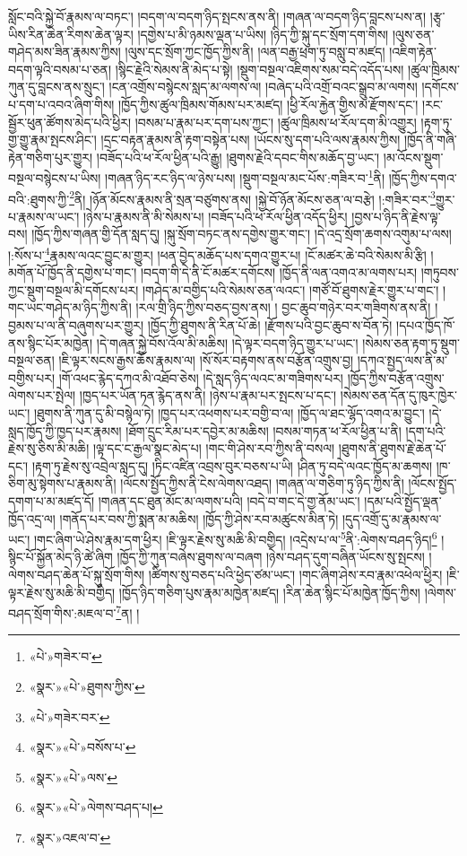 སློང་བའི་སྐྱེ་བོ་རྣམས་ལ་བཏང་། །བདག་ལ་བདག་ཉིད་སྤངས་ནས་ནི། །གཞན་ལ་བདག་ཉིད་བླངས་པས་ན། །རྩྭ་ཡིས་རིན་ཆེན་རིགས་ཆེན་ལྟར། །དགྱེས་པ་མི་ཉམས་ལྡན་པ་ཡིས། །ཉིད་ཀྱི་སྐུ་དང་སྲོག་དག་གིས། །ལུས་ཅན་གཤེད་མས་ཟིན་རྣམས་ཀྱིས། །ལུས་དང་སྲོག་ཀྱང་ཁྱོད་ཀྱིས་ནི། །ལན་བརྒྱ་ཕྲག་ཏུ་བསླུ་བ་མཛད། །འཇིག་རྟེན་བདག་ལྟའི་བསམ་པ་ཅན། །སྙིང་རྗེའི་སེམས་ནི་མེད་པ་སྟེ། །སྡུག་བསྔལ་འཇིགས་སམ་བདེ་འདོད་པས། །ཚུལ་ཁྲིམས་ཀུན་དུ་བླངས་ནས་སྲུང་། །ངན་འགྲོས་བསྙེངས་སླད་མ་ལགས་ལ། །བཞེད་པའི་འགྲོ་བའང་སྒྲུབ་མ་ལགས། །དགོངས་པ་དག་པ་འབའ་ཞིག་གིས། །ཁྱོད་ཀྱིས་ཚུལ་ཁྲིམས་གོམས་པར་མཛད། །ཕྱི་རོལ་རྐྱེན་གྱིས་མ་རྫོགས་དང་། །རང་སྦྱོར་ཕུན་ཚོགས་མེད་པའི་ཕྱིར། །བསམ་པ་རྣམ་པར་དག་པས་ཀྱང་། །ཚུལ་ཁྲིམས་ཕ་རོལ་དག་མི་འགྱུར། །རྟག་ཏུ་གྱ་གྱུ་རྣམ་སྤངས་ཤིང་། །དྲང་བརྟན་རྣམས་ནི་རྟག་བསྟེན་པས། །ཡོངས་སུ་དག་པའི་ལས་རྣམས་ཀྱིས། །ཁྱོད་ནི་གཞི་རྟེན་གཅིག་པུར་གྱུར། །བཟོད་པའི་ཕ་རོལ་ཕྱིན་པའི་རྒྱུ། །ཐུགས་རྗེའི་དབང་གིས་མཆོད་བྱ་ཡང་། །མ་འོངས་སྡུག་བསྔལ་བསྙེངས་པ་ཡིས། །གཞན་ཉིད་རང་ཉིད་ལ་ཉེས་པས། །སྡུག་བསྔལ་མང་པོས་:གཟིར་བ་\footnote{«པེ་»གཟེར་བ་}ནི། །ཁྱོད་ཀྱིས་དགའ་བའི་:ཐུགས་ཀྱི་\footnote{«སྣར་»«པེ་»ཐུགས་ཀྱིས་}ནི། །ཉོན་མོངས་རྣམས་ནི་སྲན་བཙུགས་ནས། །སྐྱེ་བོ་ཉོན་མོངས་ཅན་ལ་བརྩེ། །:གཟིར་བར་\footnote{«པེ་»གཟེར་བར་}གྱུར་པ་རྣམས་ལ་ཡང་། །ཉེས་པ་རྣམས་ནི་མི་སེམས་པ། །བཟོད་པའི་ཕ་རོལ་ཕྱིན་འདོད་ཕྱིར། །བྱས་པ་ཉིད་ནི་རྗེས་ལྟ་བས། །ཁྱོད་ཀྱིས་གཞན་གྱི་དོན་སླད་དུ། །སྐུ་སྲོག་བཏང་ནས་དགྱེས་གྱུར་གང་། །དེ་འདྲ་སྲོག་ཆགས་འགུམ་པ་ལས། །:སོས་པ་\footnote{«སྣར་»«པེ་»བསོས་པ་}རྣམས་ལའང་བྱུང་མ་གྱུར། །ཕན་བྱེད་མཆོད་པས་དགའ་གྱུར་པ། །ངོ་མཚར་ཆེ་བའི་སེམས་མི་རྩི། །མགོན་པོ་ཁྱོད་ནི་དགྱེས་པ་གང་། །བདག་གི་དེ་ནི་ངོ་མཚར་དགོངས། །ཁྱོད་ནི་ལན་འགའ་མ་ལགས་པར། །གཏུབས་ཀྱང་སྡུག་བསྔལ་མི་དགོངས་པར། །གཤེད་མ་བགྱིད་པའི་སེམས་ཅན་ལའང་། །གཙོ་བོ་ཐུགས་རྗེར་གྱུར་པ་གང་། །གང་ཡང་གཤེད་མ་ཉིད་ཀྱིས་ནི། །རལ་གྲི་ཉིད་ཀྱིས་བཅད་བྱས་ནས། །
བྱང་ཆུབ་གཉེར་བར་གཟིགས་ནས་ནི། །བྱམས་པ་ལ་ནི་བཞུགས་པར་གྱུར། །ཁྱོད་ཀྱི་ཐུགས་ནི་རིན་པོ་ཆེ། །རྫོགས་པའི་བྱང་ཆུབ་ས་བོན་ཏེ། །དཔའ་ཁྱོད་ཁོ་ནས་སྙིང་པོར་མཁྱེན། །དེ་གཞན་སྐྱེ་བོས་འོལ་མི་མཆིས། །དེ་ལྟར་བདག་ཉིད་གྱུར་པ་ཡང་། །སེམས་ཅན་རྟག་ཏུ་སྡུག་བསྔལ་ཅན། །ཇི་ལྟར་སངས་རྒྱས་ཆོས་རྣམས་ལ། །སོ་སོར་བརྟགས་ནས་བརྩོན་འགྲུས་བྱ། །དཀའ་སྤྱད་ལས་ནི་མ་བགྱིས་པར། །གོ་འཕང་རྙེད་དཀའ་མི་འཐོབ་ཅེས། །དེ་སླད་ཉིད་ལའང་མ་གཟིགས་པར། །ཁྱོད་ཀྱིས་བརྩོན་འགྲུས་ལེགས་པར་སྤེལ། །ཁྱད་པར་ཡོན་ཏན་རྙེད་ནས་ནི། །ཉེས་པ་རྣམ་པར་སྤངས་པ་དང་། །སེམས་ཅན་དོན་དུ་ཁུར་ཁྱེར་ཡང་། །ཐུགས་ནི་ཀུན་དུ་མི་བསྙེལ་ཏེ། །ཁྱད་པར་འཕགས་པར་བགྱི་བ་ལ། །ཁྱོད་ལ་ཐང་ལྷོད་འགའ་མ་བྱུང་། །དེ་སླད་ཁྱོད་ཀྱི་ཁྱད་པར་རྣམས། །ཐོག་དྲུང་རིམ་པར་དབྱེར་མ་མཆིས། །བསམ་གཏན་ཕ་རོལ་ཕྱིན་པ་ནི། །དག་པའི་རྗེས་སུ་ཅིས་མི་མཆི། །ལྟ་དང་ང་རྒྱལ་སྣང་མེད་པ། །གང་གི་ཤེས་རབ་ཀྱིས་ནི་བསལ། །ཐུགས་ནི་ཐུགས་རྗེ་ཆེན་པོ་དང་། །རྟག་ཏུ་རྗེས་སུ་འབྲེལ་སླད་དུ། །ཏིང་འཛིན་འབྲས་བུར་བཅས་པ་ཡི། །ཤིན་ཏུ་བདེ་ལའང་ཁྱོད་མ་ཆགས། །ཁ་ཅིག་མུ་སྟེགས་པ་རྣམས་ནི། །ལོངས་སྤྱོད་ཀྱིས་ནི་ངེས་ལེགས་འཐད། །གཞན་ལ་གཅིག་ཏུ་ཉིད་ཀྱིས་ནི། །ལོངས་སྤྱོད་དགག་པ་མ་མཛད་དོ། །གཞན་དང་ཐུན་མོང་མ་ལགས་པའི། །བདེ་བ་གང་དེ་གྱ་ནོམ་ཡང་། །དམ་པའི་སྤྱོད་ལྡན་ཁྱོད་འདྲ་ལ། །གནོད་པར་བས་ཀྱི་སྨན་མ་མཆིས། །ཁྱོད་ཀྱི་ཤེས་རབ་མཚུངས་མིན་ཏེ། །དུད་འགྲོ་དུ་མ་རྣམས་ལ་ཡང་། །གང་ཞིག་ཡེ་ཤེས་རྣམ་དག་ཕྱིར། །ཇི་ལྟར་རྗེས་སུ་མཆི་མི་བགྱིད། །འདྲེས་པ་ལ་\footnote{«སྣར་»«པེ་»ལས་}ནི་:ལེགས་བཤད་ཉིད།\footnote{«སྣར་»«པེ་»ལེགས་བཤད་པ།} །སྙིང་པོ་སྐྱོན་མེད་ཉི་ཚེ་ཞིག །ཁྱོད་ཀྱི་ཀུན་བཞེས་ཐུགས་ལ་བཞག །ཉེས་བཤད་དུག་བཞིན་ཡོངས་སུ་སྤངས། །ལེགས་བཤད་ཆེན་པོ་སྐུ་སྲོག་གིས། །ཚིགས་སུ་བཅད་པའི་ཕྱེད་ཙམ་ཡང་། །གང་ཞིག་ཤེས་རབ་རྣམ་འཕེལ་ཕྱིར། །ཇི་ལྟར་རྗེས་སུ་མཆི་མི་བགྱིད། །ཁྱོད་ཉིད་གཅིག་པུས་རྣམ་མཁྱེན་མཛད། །རིན་ཆེན་སྙིང་པོ་མཁྱེན་ཁྱོད་ཀྱིས། །ལེགས་བཤད་སྲོག་གིས་:མཇལ་བ་\footnote{«སྣར་»འཇལ་བ་}ན། །
